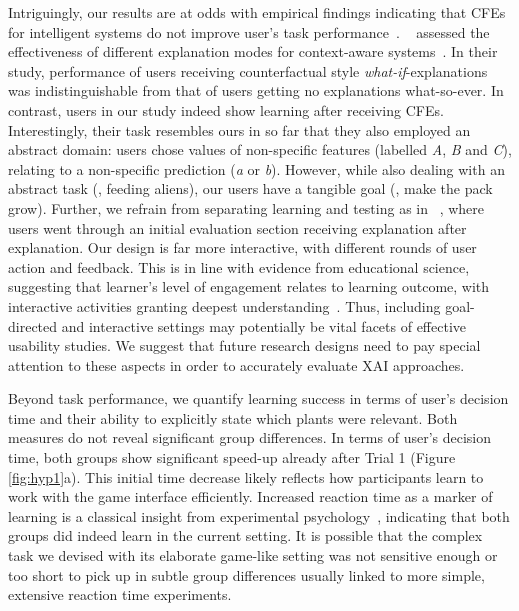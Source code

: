Intriguingly, our results are at odds with empirical findings indicating that \glspl{CFE} for intelligent systems do not improve user's task performance~\citep{lim_why_2009, van_der_waa_evaluating_2021}.
~\citeauthor{lim_why_2009} assessed the effectiveness of different explanation modes for context-aware systems~\citep{lim_why_2009}. 
In their study, performance of users receiving counterfactual style \textit{what-if}-explanations was indistinguishable from that of users getting no explanations what-so-ever.
In contrast, users in our study indeed show learning after receiving \glspl{CFE}.
Interestingly, their task resembles ours in so far that they also employed an abstract domain: users chose values of non-specific features (labelled \textit{A}, \textit{B} and \textit{C}), relating to a non-specific prediction (\textit{a} or \textit{b}).
However, while also dealing with an abstract task (\ie, feeding aliens), our users have a tangible goal (\ie, make the pack grow).
Further, we refrain from separating learning and testing as in ~\citeauthor{lim_why_2009}, where users went through an initial evaluation section receiving explanation after explanation.
Our design is far more interactive, with different rounds of user action and feedback.
This is in line with evidence from educational science, suggesting that learner's level of engagement relates to learning outcome, with interactive activities granting deepest understanding~\citep{chi_icap_2014}.
Thus, including goal-directed and interactive settings may potentially be vital facets of effective usability studies. 
We suggest that future research designs need to pay special attention to these aspects in order to accurately evaluate \gls{XAI} approaches.

Beyond task performance, we quantify learning success in terms of user's decision time and their ability to explicitly state which plants were relevant. %
Both measures do not reveal significant group differences.
In terms of user's decision time, both groups show significant speed-up already after Trial 1 (Figure \ref{fig:hyp1}a).
This initial time decrease likely reflects how participants learn to work with the game interface efficiently.
Increased reaction time as a marker of learning is a classical insight from experimental psychology~\citep{logan_shapes_1992}, indicating that both groups did indeed learn in the current setting. 
It is possible that the complex task we devised with its elaborate game-like setting was not sensitive enough or too short to pick up in subtle group differences usually linked to more simple, extensive reaction time experiments.

